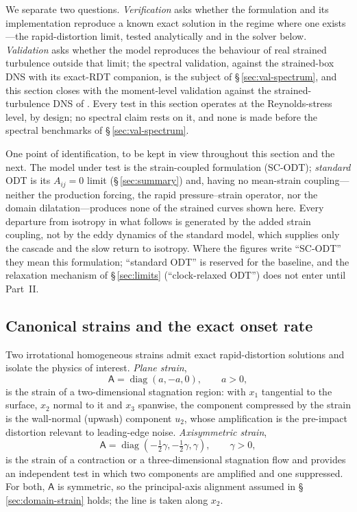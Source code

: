 \documentclass[lineno]{JFM-FLM_Au}
\begin{document}
We separate two questions. \emph{Verification} asks whether the
formulation and its implementation reproduce a known exact solution in
the regime where one exists---the rapid-distortion limit, tested
analytically and in the solver below. \emph{Validation} asks whether the
model reproduces the behaviour of real strained turbulence outside that
limit; the spectral validation, against the strained-box DNS with its
exact-RDT companion, is the subject of \S\,\ref{sec:val-spectrum}, and
this section closes with the moment-level validation against the
strained-turbulence DNS of \citet{LeeReynolds1985}. Every test in this
section operates at the Reynolds-stress level, by design; no spectral
claim rests on it, and none is made before the spectral benchmarks of
\S\,\ref{sec:val-spectrum}.

One point of identification, to be kept in view throughout this section
and the next. The model under test is the strain-coupled formulation
(SC-ODT); \emph{standard} ODT is its $A_{ij}=0$ limit
(\S\,\ref{sec:summary}) and, having no mean-strain coupling---neither
the production forcing, the rapid pressure--strain operator, nor the
domain dilatation---produces none of the strained curves shown here.
Every departure from isotropy in what follows is generated by the added
strain coupling, not by the eddy dynamics of the standard model, which
supplies only the cascade and the slow return to isotropy. Where the
figures write ``SC-ODT'' they mean this formulation; ``standard ODT''
is reserved for the baseline, and the relaxation mechanism of
\S\,\ref{sec:limits} (``clock-relaxed ODT'') does not enter until
Part~II.

\subsection{Canonical strains and the exact onset rate}\label{sec:onset}

Two irrotational homogeneous strains admit exact rapid-distortion
solutions and isolate the physics of interest. \emph{Plane strain},
\begin{equation}
  \mathsf{A}=\operatorname{diag}(a,-a,0),\qquad a>0,
  \label{eq:plane-strain}
\end{equation}
is the strain of a two-dimensional stagnation region: with $x_1$
tangential to the surface, $x_2$ normal to it and $x_3$ spanwise, the
component compressed by the strain is the wall-normal (upwash) component
$u_2$, whose amplification is the pre-impact distortion relevant to
leading-edge noise. \emph{Axisymmetric strain},
\begin{equation}
  \mathsf{A}=\operatorname{diag}(-\tfrac12\gamma,-\tfrac12\gamma,\gamma),
  \qquad \gamma>0,
  \label{eq:axi-strain}
\end{equation}
is the strain of a contraction or a three-dimensional stagnation flow and
provides an independent test in which two components are amplified and
one suppressed. For both, $\mathsf{A}$ is symmetric, so the
principal-axis alignment assumed in \S\,\ref{sec:domain-strain} holds;
the line is taken along $x_2$.
\end{document}
